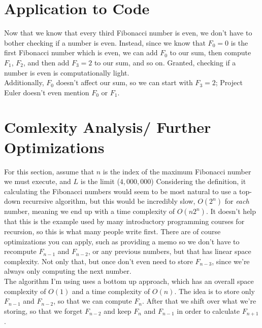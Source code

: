 \documentclass[11pt, oneside]{article}   	%
\begin{document}
\section{Application to Code}
	Now that we know that every third Fibonacci number is even, we don't have to bother checking if a number is even. Instead, since we know that $F_0 = 0$ is the first Fibonacci number which is even, we can add $F_0$ to our sum, then compute $F_1$, $F_2$, and then add $F_3=2$ to our sum, and so on. Granted, checking if a number is even is computationally light.\\

	Additionally, $F_0$ doesn't affect our sum, so we can start with $F_3=2$; Project Euler doesn't even mention $F_0$ or $F_1$.

\section{Comlexity Analysis/ Further Optimizations}
	For this section, assume that $n$ is the index of the maximum Fibonacci number we must execute, and $L$ is the limit ($4,000,000$)
	Considering the definition, it calculating the Fibonacci numbers would seem to be most natural to use a top-down recurrsive algorithm, but this would be incredibly slow, $O(2^n)$ for \textit{each} number, meaning we end up with a time complexity of $O(n2^n)$. It doesn't help that this is the example used by many introductory programming courses for recursion, so this is what many people write first. There are of course optimizations you can apply, such as providing a memo so we don't have to recompute $F_{n-1}$ and $F_{n-2}$, or any previous numbers, but that has linear space complexity. Not only that, but once don't even need to store $F_{n-3}$, since we're always only computing the next number.\\
	The algorithm I'm using uses a bottom up approach, which has an overall space complexity of $O(1)$ and a time complexity of $O(n)$. The idea is to store only $F_{n-1}$ and $F_{n-2}$, so that we can compute $F_n$. After that we shift over what we're storing, so that we forget $F_{n-2}$ and keep $F_n$ and $F_{n-1}$ in order to calculate $F_{n+1}$.
\end{document}
